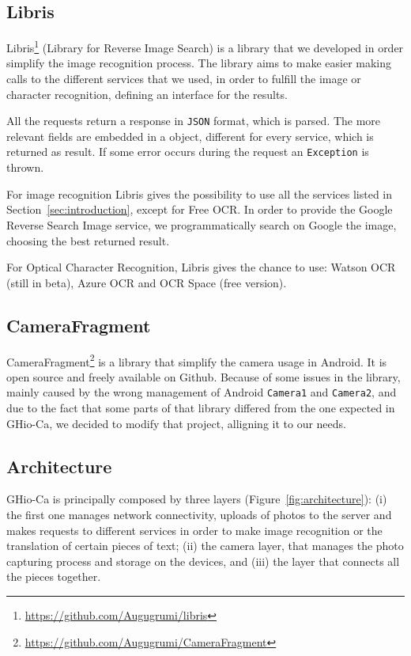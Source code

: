 \subsection{Libris}
Libris\footnote{\url{https://github.com/Augugrumi/libris}} (Library for Reverse
Image Search) is a library that we developed in order simplify the image 
recognition process. The library aims to make easier making calls to 
the different services that we used, in order to fulfill the image or 
character recognition, defining an interface for the results.

All the requests return a response in \texttt{JSON} format, which is parsed.
The more relevant fields are embedded in a object, different for every
service, which is returned as result. If some error occurs during the request an
\texttt{Exception} is thrown.

For image recognition Libris gives the possibility to use all the services
listed in Section~\ref{sec:introduction}, except for Free OCR. In order to
provide the Google Reverse Search Image service, we programmatically search on
Google the image, choosing the best returned result.

For Optical Character Recognition, Libris gives the chance to use: Watson OCR (still in
beta), Azure OCR and OCR Space (free version).

\subsection{CameraFragment}
CameraFragment\footnote{\url{https://github.com/Augugrumi/CameraFragment}} is a
library that simplify the camera usage in Android. It is open source and freely 
available on Github. Because of some issues in the library, mainly caused by 
the wrong management of Android \texttt{Camera1} and \texttt{Camera2}, and due 
to the fact that some parts of that library differed from the one expected in 
GHio-Ca, we decided to modify that project, alligning it to our needs.

\subsection{Architecture}
GHio-Ca is principally composed by three layers (Figure~\ref{fig:architecture}):
(i) the first one manages network connectivity, uploads of photos to the server
and makes requests to different services in order to make image recognition
or the translation of certain pieces of text; (ii) the camera layer, that
manages the photo capturing process and storage on the devices, and (iii) the
layer that connects all the pieces together.

